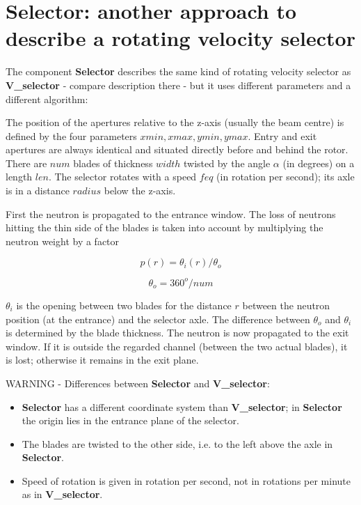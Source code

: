 \section{Selector: another approach to describe a rotating velocity selector}
\label{selector}


The component {\bf Selector} describes the same kind of rotating velocity selector as {\bf V\_selector} - compare
description there - but it uses different parameters and a different algorithm:

The position of the apertures relative to the z-axis (usually the beam centre) is defined by the four parameters
$xmin, xmax, ymin, ymax$. Entry and exit apertures are always identical and situated directly before and behind
the rotor.
There are $num$ blades of thickness $width$ twisted by the angle $\alpha$ (in degrees) on a length $len$.
The selector rotates with a speed $feq$ (in rotation per second); its axle is in a distance $radius$ below the z-axis.

First the neutron is propagated to the entrance window. The loss of neutrons hitting the thin side
of the blades is taken into account by multiplying the neutron weight by a factor

\begin{equation}
   p(r) = \theta_i(r) / \theta_o
\end{equation}

\begin{equation}
   \theta_o = 360^o / num
\end{equation}

$\theta_i$ is the opening between two blades for the distance $r$ between the neutron position (at the entrance)
and the selector axle. The difference between $\theta_o$ and $\theta_i$ is determined by the blade thickness.
The neutron is now propagated to the exit window. If it is outside the regarded channel (between the two actual
blades), it is lost; otherwise it remains in the exit plane.

WARNING - Differences between {\bf Selector} and {\bf V\_selector}:
\begin{itemize}
\item {\bf Selector} has a different coordinate system than {\bf V\_selector};
in {\bf Selector} the origin lies in the entrance plane of the selector.
\item The blades are twisted to the other side, i.e. to the left above the axle in {\bf Selector}.
\item Speed of rotation is given in rotation per second, not in rotations per minute as in {\bf V\_selector}.
\end{itemize}



